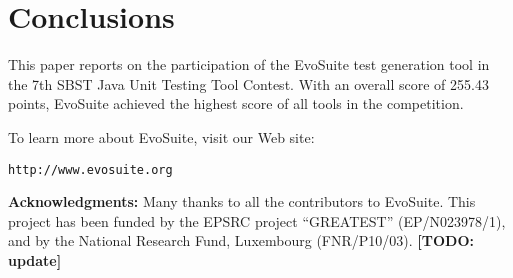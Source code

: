 \documentclass[sigconf,table]{acmart}
\newcommand{\TODO}[1]{\textbf{\textcolor{ScarletRed}{[TODO: #1]}}\xspace}
\newcommand{\TODO}[1]{}
\newcommand{\EVOSUITE}{{\sc EvoSuite}\xspace}
\newcommand{\TOTALPOINTS}{{255.43}\xspace}
\begin{document}
\section{Conclusions}

This paper reports on the participation of the \EVOSUITE test
generation tool in the 7th SBST Java Unit Testing Tool Contest. With
an overall score of \TOTALPOINTS points, \EVOSUITE achieved the highest score
of all tools in the competition.


To learn more about \EVOSUITE, visit our Web site:
\begin{center}
\texttt{http://www.evosuite.org}
\end{center}



\textbf{Acknowledgments:} Many thanks to all the contributors to
\EVOSUITE.  This project has been funded by the EPSRC project
``GREATEST'' (EP/N023978/1), and by the National Research Fund,
Luxembourg (FNR/P10/03). \TODO{update}




\balance
\end{document}
